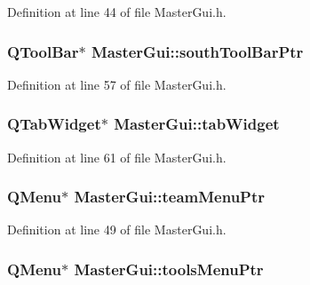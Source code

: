 Definition at line 44 of file Master\-Gui.\-h.

\hypertarget{class_master_gui_a4a0234ba347ba345e79eff8c19ba27c8}{
\subsubsection[{south\-Tool\-Bar\-Ptr}]{\setlength{\rightskip}{0pt plus 5cm}Q\-Tool\-Bar$\ast$ Master\-Gui\-::south\-Tool\-Bar\-Ptr\hspace{0.3cm}{\ttfamily [private]}}}\label{class_master_gui_a4a0234ba347ba345e79eff8c19ba27c8}


Definition at line 57 of file Master\-Gui.\-h.

\hypertarget{class_master_gui_a3bca8bd4cc4ecef70de27afff52a7b08}{
\subsubsection[{tab\-Widget}]{\setlength{\rightskip}{0pt plus 5cm}Q\-Tab\-Widget$\ast$ Master\-Gui\-::tab\-Widget\hspace{0.3cm}{\ttfamily [private]}}}\label{class_master_gui_a3bca8bd4cc4ecef70de27afff52a7b08}


Definition at line 61 of file Master\-Gui.\-h.

\hypertarget{class_master_gui_ad1d5b1e487d4695bab91ab0db856d795}{
\subsubsection[{team\-Menu\-Ptr}]{\setlength{\rightskip}{0pt plus 5cm}Q\-Menu$\ast$ Master\-Gui\-::team\-Menu\-Ptr\hspace{0.3cm}{\ttfamily [private]}}}\label{class_master_gui_ad1d5b1e487d4695bab91ab0db856d795}


Definition at line 49 of file Master\-Gui.\-h.

\hypertarget{class_master_gui_ab751e75ffdf91f5b90b4c2900975f308}{
\subsubsection[{tools\-Menu\-Ptr}]{\setlength{\rightskip}{0pt plus 5cm}Q\-Menu$\ast$ Master\-Gui\-::tools\-Menu\-Ptr\hspace{0.3cm}{\ttfamily [private]}}}\label{class_master_gui_ab751e75ffdf91f5b90b4c2900975f308}


